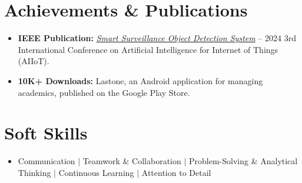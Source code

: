 \documentclass[letterpaper,11pt]{article}
\newcommand{\skillLine}[1]{\item\small{#1}\vspace{-4pt}}
\newcommand{\resumeSkillListStart}{\begin{itemize}[leftmargin=0.15in, label={}]}
\newcommand{\resumeSkillListEnd}{\end{itemize}\vspace{-6pt}}
\begin{document}
\section{Achievements \& Publications}
\resumeSkillListStart
    \skillLine{\textbf{IEEE Publication:} \href{https://ieeexplore.ieee.org/document/10574574}{\textit{Smart Surveillance Object Detection System}} -- 2024 3rd International Conference on Artificial Intelligence for Internet of Things (AIIoT).}
    \skillLine{\textbf{10K+ Downloads:} Lastone, an Android application for managing academics, published on the Google Play Store.}
\resumeSkillListEnd

\section{Soft Skills}
\resumeSkillListStart
    \skillLine{Communication $|$ Teamwork \& Collaboration $|$ Problem-Solving \& Analytical Thinking $|$ Continuous Learning $|$ Attention to Detail}
\resumeSkillListEnd
\end{document}
